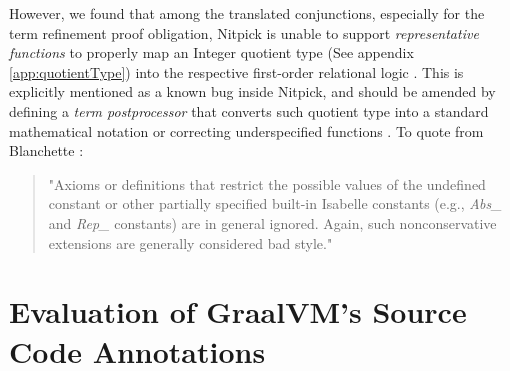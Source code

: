 However, we found that among the translated conjunctions, especially for the term refinement proof obligation, 
Nitpick is unable to support \emph{representative functions} to properly map an Integer quotient type (See appendix \ref{app:quotientType}) 
into the respective first-order relational logic \cite[Ch. 8]{isabelleNitpick}. This is explicitly mentioned as a known bug inside Nitpick, 
and should be amended by defining a \emph{term postprocessor} that converts such quotient type into a standard mathematical notation 
\cite[Sec. 3.7]{isabelleNitpick} or correcting underspecified functions \cite[Ch. 8]{isabelleNitpick}. 
To quote from Blanchette \cite[Ch. 8]{isabelleNitpick}:

\begin{quote}
    "Axioms or definitions that restrict the possible values of the undefined
    constant or other partially specified built-in Isabelle constants (e.g.,
    \emph{Abs\_} and \emph{Rep\_} constants) are in general ignored. Again, such nonconservative extensions are generally considered bad style."
\end{quote}

\section{Evaluation of GraalVM's Source Code Annotations}


\lipsum[1]

